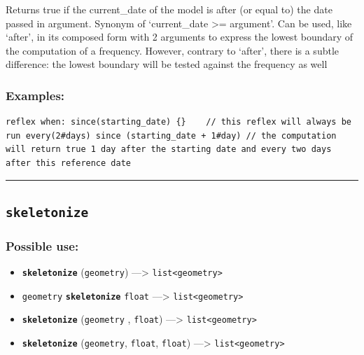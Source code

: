 \documentclass[]{book}
\providecommand{\tightlist}{%
  \setlength{\itemsep}{0pt}\setlength{\parskip}{0pt}}
\theoremstyle{definition}
\theoremstyle{definition}
\theoremstyle{definition}
\theoremstyle{remark}
\begin{document}
Returns true if the current\_date of the model is after (or equal to)
the date passed in argument. Synonym of `current\_date \textgreater{}=
argument'. Can be used, like `after', in its composed form with 2
arguments to express the lowest boundary of the computation of a
frequency. However, contrary to `after', there is a subtle difference:
the lowest boundary will be tested against the frequency as well

\subsubsection{Examples:}\label{examples-334}

\begin{verbatim}
reflex when: since(starting_date) {}    // this reflex will always be run every(2#days) since (starting_date + 1#day) // the computation will return true 1 day after the starting date and every two days after this reference date 
\end{verbatim}

\begin{center}\rule{0.5\linewidth}{\linethickness}\end{center}

\subsection{\texorpdfstring{\texttt{skeletonize}}{skeletonize}}\label{skeletonize}

\subsubsection{Possible use:}\label{possible-use-479}

\begin{itemize}
\tightlist
\item
  \textbf{\texttt{skeletonize}} (\texttt{geometry}) ---\textgreater{}
  \texttt{list\textless{}geometry\textgreater{}}
\item
  \texttt{geometry} \textbf{\texttt{skeletonize}} \texttt{float}
  ---\textgreater{} \texttt{list\textless{}geometry\textgreater{}}
\item
  \textbf{\texttt{skeletonize}} (\texttt{geometry} , \texttt{float})
  ---\textgreater{} \texttt{list\textless{}geometry\textgreater{}}
\item
  \textbf{\texttt{skeletonize}} (\texttt{geometry}, \texttt{float},
  \texttt{float}) ---\textgreater{}
  \texttt{list\textless{}geometry\textgreater{}}
\end{itemize}
\end{document}
